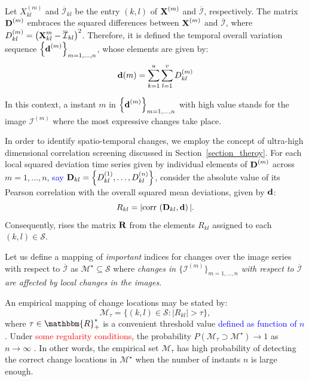 \documentclass[journal]{IEEEtran}
\def\corr{\mbox{{\rm corr\,}}}
\newcommand{\vD}{{\textbf D}}
\newcommand{\vd}{{\textbf d}}
\newcommand{\vR}{{\textbf R}}
\newcommand{\vX}{{\textbf X}}
\begin{document}
Let $X_{kl}^{(m)}$ and $\overline{\mathcal{I}}_{kl}$ be the entry $(k,l)$ of $\vX^{(m)}$ and $\overline{\mathcal{I}}$, respectively. 
%
The matrix $\vD^{(m)}$ embraces the squared differences between $\vX^{(m)}$ and $\overline{\mathcal{I}}$, where $D_{kl}^{(m)} = \left( \vX_{kl}^{m} - \overline{\mathcal{I}}_{kl} \right)^2$.
%
Therefore, it is defined the temporal overall variation sequence $\left\lbrace \vd^{(m)}  \right\rbrace_{m=1,\ldots,n}$, whose elements are given by:
\begin{equation}\label{E:eq_defdm}
\vd(m)= \sum_{k=1}^{u} \sum_{l=1}^{v} D_{kl}^{(m)} %
\end{equation}


In this context, a instant $m$ in $\left\lbrace \vd^{(m)}  \right\rbrace_{m=1,\ldots,n}$ with high value stands for the image $\mathcal{I}^{(m)}$ where the most expressive changes take place.



In order to identify spatio-temporal changes, we employ the concept of ultra-high dimensional correlation screening \cite{fan2020statistical} discussed in Section~\ref{section_theroy}. For each local squared deviation time series given by individual elements of $\vD^{(m)}$ across $m=1,\ldots,n$, \textcolor{blue}{say $\vD_{kl} = \left\lbrace D_{kl}^{(1)},\ldots,D_{kl}^{(n)} \right\rbrace$}, consider the absolute value of its Pearson correlation with the overall squared mean deviations, given by $\vd$:
\begin{equation*}\label{def_Rkld}
R_{kl}= |\corr \left( \vD_{kl}, \vd \right)|.
\end{equation*}
Consequently, rises the matrix $\vR$ from the elements $R_{kl}$ assigned to each $(k,l) \in \mathcal{S}$.




Let us define a mapping of \textit{important} indices for changes over the image series with respect to $\overline{\mathcal I}$ as $\mathcal{M}^{\star} \subseteq \mathcal{S}$ where \textit{changes in $\{\mathcal{I}^{(m)}\}_{m=1,\ldots,n}$ with respect to $\overline{\mathcal{I}}$ are affected by local changes in the images}.




An empirical mapping of change locations may be stated by:
\begin{equation}
\mathcal{M}_{\tau} = \{(k,l) \in \mathcal{S} : |R_{kl}|>\tau\},
\label{E:def_Mtaud}
\end{equation}
where $\tau \in \mathbbm{R}_{+}^{*}$ is a convenient threshold value \textcolor{blue}{defined as function of $n$}. Under \textcolor{red}{some regularity conditions}, the probability $P(\mathcal{M}_{\tau}\supset\mathcal{M}^{\star}) \rightarrow 1$ as $n\rightarrow\infty$ \cite{fan2020statistical}. In other words, the empirical set $\mathcal{M}_{\tau}$ has high probability of detecting the correct change locations in $\mathcal{M}^{\star}$ when the number of instants $n$ is large enough. 
\end{document}
